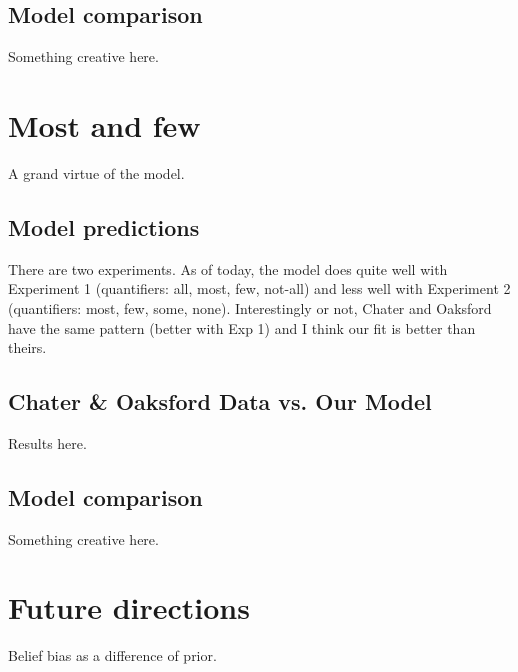 \documentclass[10pt,letterpaper]{article}
\begin{document}
\subsection{Model comparison}

Something creative here.

\section{Most and few}

A grand virtue of the model. 

\subsection{Model predictions}

There are two experiments. As of today, the model does quite well with Experiment 1 (quantifiers: all, most, few, not-all) and less well with Experiment 2 (quantifiers: most, few, some, none). Interestingly or not, Chater and Oaksford have the same pattern (better with Exp 1) and I think our fit is better than theirs.

\subsection{Chater \& Oaksford Data vs. Our Model}

Results here.

\subsection{Model comparison}

Something creative here.

\section{Future directions}

Belief bias as a difference of prior.



\setlength{\bibleftmargin}{.125in}
\setlength{\bibindent}{-\bibleftmargin}


\end{document}
